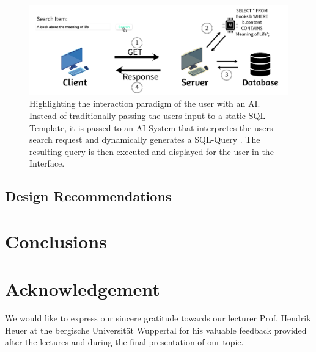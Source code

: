 \documentclass[manuscript,review]{acmart}
\begin{document}
\begin{figure}[h]
  \includegraphics[width=\textwidth]{images/front_image}
  \caption{Highlighting the interaction paradigm of the user with an AI. Instead
  of traditionally passing the users input to a static SQL-Template, it is passed 
  to an AI-System that interpretes the users search request and dynamically generates a SQL-Query
  . The resulting query is then executed and displayed for the user in the Interface.}
\end{figure}












\subsection{Design Recommendations}

\section{Conclusions}

\section{Acknowledgement}
We would like to express our sincere gratitude 
towards our lecturer Prof. Hendrik Heuer at the
bergische Universität Wuppertal for his 
valuable feedback provided after the lectures 
and during the final presentation
of our topic.




\end{document}
